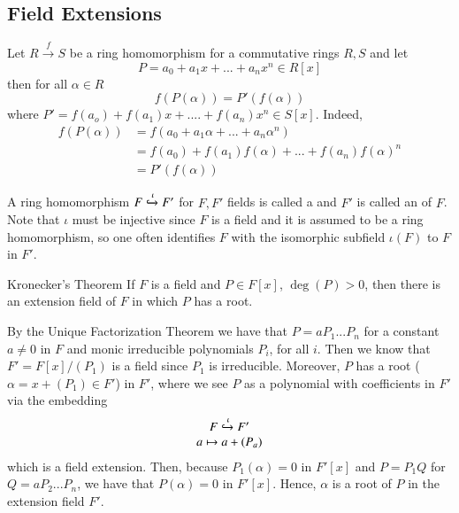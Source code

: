 \documentclass[12pt, a4paper, twoside, openright, titlepage]{book}
\begin{document}
\subsection{\textsection Field Extensions}

\begin{rmk}{}{}
        Let $R\xrightarrow{f} S$ be a ring homomorphism for a commutative rings $R,S$ and let \begin{equation}
                P = a_0+a_1x+...+a_nx^n \in R[x]
        \end{equation}
        then for all $\alpha \in R$ \begin{equation}
                f(P(\alpha)) = P'(f(\alpha))
        \end{equation}
        where $P' = f(a_o) + f(a_1)x+....+f(a_n)x^n \in S[x]$. Indeed, \begin{align*}
                f(P(\alpha)) &= f(a_0+a_1\alpha+...+a_n\alpha^n) \\
                &= f(a_0) + f(a_1)f(\alpha)+...+f(a_n)f(\alpha)^n \\
                &= P'(f(\alpha))
        \end{align*}
\end{rmk}

\begin{defn}{}{}
        A ring homomorphism $F \xhookrightarrow{\iota} F'$ for $F, F'$ fields is called a  and $F'$ is called an  of $F$. Note that $\iota$ must be injective since $F$ is a field and it is assumed to be a ring homomorphism, so one often identifies $F$ with the isomorphic subfield $\iota(F)$ to $F$ in $F'$.
\end{defn}


\begin{thm}{Kronecker's Theorem}{}
        If $F$ is a field and $P \in F[x]$, $\deg(P) > 0$, then there is an extension field of $F$ in which $P$ has a root.
\end{thm}
\begin{proof*}{}{}
        By the Unique Factorization Theorem we have that $P = aP_1...P_n$ for a constant $a \neq 0$ in $F$ and monic irreducible polynomials $P_i$, for all $i$. Then we know that $F' = F[x]/(P_1)$ is a field since $P_1$ is irreducible. Moreover, $P$ has a root ($\alpha = x+(P_1) \in F'$) in $F'$, where we see $P$ as a polynomial with coefficients in $F'$ via the embedding \begin{equation}
                \begin{array}{c} F\xhookrightarrow{\iota}F' \\ a\mapsto a+(P_a) \end{array}
        \end{equation}
        which is a field extension. Then, because $P_1(\alpha) = 0$ in $F'[x]$ and $P = P_1Q$ for $Q = aP_2...P_n$, we have that $P(\alpha) = 0$ in $F'[x]$. Hence, $\alpha$ is a root of $P$ in the extension field $F'$.
\end{proof*}
\end{document}
